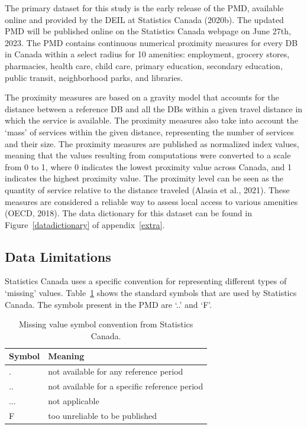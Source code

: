 \documentclass[11pt, a4paper]{article}
\begin{document}
The primary dataset for this study is the early release of the PMD, available online and provided by the DEIL at Statistics Canada (2020b). The updated PMD will be published online on the Statistics Canada webpage on June 27th, 2023. The PMD contains continuous numerical proximity measures for every DB in Canada within a select radius for 10 amenities: employment, grocery stores, pharmacies, health care, child care, primary education, secondary education, public transit, neighborhood parks, and libraries.
\par
The proximity measures are based on a gravity model that accounts for the distance between a reference DB and all the DBs within a given travel distance in which the service is available. The proximity measures also take into account the `mass' of services within the given distance, representing the number of services and their size. The proximity measures are published as normalized index values, meaning that the values resulting from computations were converted to a scale from 0 to 1, where 0 indicates the lowest proximity value across Canada, and 1 indicates the highest proximity value. The proximity level can be seen as the quantity of service relative to the distance traveled (Alasia et al., 2021). These measures are considered a reliable way to assess local access to various amenities (OECD, 2018). The data dictionary for this dataset can be found in Figure~\ref{datadictionary} of appendix~\ref{extra}.







\subsection{Data Limitations}


Statistics Canada uses a specific convention for representing different types of `missing' values. Table~\ref{missingvalues} shows the standard symbols that are used by Statistics Canada. The symbols present in the PMD are `..' and `F'.





\begin{table}[H]
\centering
\caption[Missing value symbols]{Missing value symbol convention from Statistics Canada.}\label{missingvalues}
\begin{tabular}{|l|l|}
\hline
\textbf{Symbol} & \textbf{Meaning} \\
\hline
. & not available for any reference period \\
\hline
.. & not available for a specific reference period \\
\hline
... & not applicable \\
\hline
F & too unreliable to be published \\
\hline
\end{tabular}
\end{table}
\end{document}
